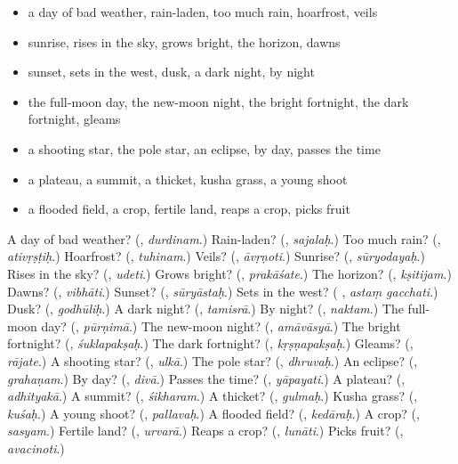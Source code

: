 \begin{itemize}
\raggedright
  \item a day of bad weather, rain-laden, too much rain, hoarfrost, veils
  \item sunrise, rises in the sky, grows bright, the horizon, dawns
  \item sunset, sets in the west, dusk, a dark night, by night
  \item the full-moon day, the new-moon night, the bright fortnight, the dark fortnight, gleams
  \item a shooting star, the pole star, an eclipse, by day, passes the time
  \item a plateau, a summit, a thicket, kusha grass, a young shoot
  \item a flooded field, a crop, fertile land, reaps a crop, picks fruit
\end{itemize}

\begin{tcolorbox}[breakable,colback=teal!4,colframe=teal!35!black,title={Before you move on}]
A day of bad weather? (\textbf{}, \emph{durdinam}.) Rain-laden? (\textbf{}, \emph{sajalaḥ}.) Too much rain? (\textbf{}, \emph{ativṛṣṭiḥ}.) Hoarfrost? (\textbf{}, \emph{tuhinam}.) Veils? (\textbf{}, \emph{āvṛṇoti}.) Sunrise? (\textbf{}, \emph{sūryodayaḥ}.) Rises in the sky? (\textbf{}, \emph{udeti}.) Grows bright? (\textbf{}, \emph{prakāśate}.) The horizon? (\textbf{}, \emph{kṣitijam}.) Dawns? (\textbf{}, \emph{vibhāti}.) Sunset? (\textbf{}, \emph{sūryāstaḥ}.) Sets in the west? (\textbf{ }, \emph{astaṃ gacchati}.) Dusk? (\textbf{}, \emph{godhūliḥ}.) A dark night? (\textbf{}, \emph{tamisrā}.) By night? (\textbf{}, \emph{naktam}.) The full-moon day? (\textbf{}, \emph{pūrṇimā}.) The new-moon night? (\textbf{}, \emph{amāvāsyā}.) The bright fortnight? (\textbf{}, \emph{śuklapakṣaḥ}.) The dark fortnight? (\textbf{}, \emph{kṛṣṇapakṣaḥ}.) Gleams? (\textbf{}, \emph{rājate}.) A shooting star? (\textbf{}, \emph{ulkā}.) The pole star? (\textbf{}, \emph{dhruvaḥ}.) An eclipse? (\textbf{}, \emph{grahaṇam}.) By day? (\textbf{}, \emph{divā}.) Passes the time? (\textbf{}, \emph{yāpayati}.) A plateau? (\textbf{}, \emph{adhityakā}.) A summit? (\textbf{}, \emph{śikharam}.) A thicket? (\textbf{}, \emph{gulmaḥ}.) Kusha grass? (\textbf{}, \emph{kuśaḥ}.) A young shoot? (\textbf{}, \emph{pallavaḥ}.) A flooded field? (\textbf{}, \emph{kedāraḥ}.) A crop? (\textbf{}, \emph{sasyam}.) Fertile land? (\textbf{}, \emph{urvarā}.) Reaps a crop? (\textbf{}, \emph{lunāti}.) Picks fruit? (\textbf{}, \emph{avacinoti}.)
\end{tcolorbox}
